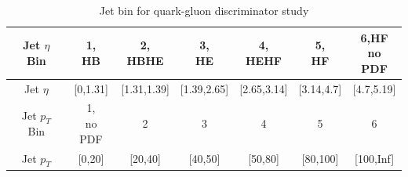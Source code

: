 \begin{table}[htbp]
\fontsize{10 pt}{1.2 em}
\selectfont
\begin{centering}
\caption{\label{tab:c4ttqgl} Jet bin for quark-gluon discriminator study}
\hspace*{-4ex}
\begin{tabular}{|c|c|c|c|c|c|c|}
\hline
Jet $\eta$ Bin  & \specialcell{1,\\HB} & \specialcell{2,\\HBHE} & \specialcell{3,\\HE} & \specialcell{4,\\HEHF} & \specialcell{5,\\HF} & \specialcell{6,HF \\no PDF} \\
\hline
Jet $\eta$      & [0,1.31] & [1.31,1.39] & [1.39,2.65] & [2.65,3.14] & [3.14,4.7] & [4.7,5.19] \\
\hline
Jet $p_{T}$ Bin & \specialcell{1,\\no PDF} & 2 & 3 & 4 & 5 & 6 \\
\hline
Jet $p_{T}$     & [0,20] & [20,40] & [40,50] & [50,80] & [80,100] & [100,Inf] \\
\hline
\end{tabular}
\par\end{centering}
\end{table}

